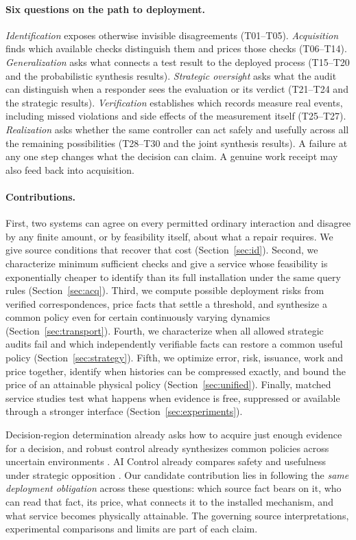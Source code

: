 \paragraph{Six questions on the path to deployment.}
\emph{Identification} exposes otherwise invisible disagreements (T01--T05). \emph{Acquisition} finds which available checks distinguish them and prices those checks (T06--T14). \emph{Generalization} asks what connects a test result to the deployed process (T15--T20 and the probabilistic synthesis results). \emph{Strategic oversight} asks what the audit can distinguish when a responder sees the evaluation or its verdict (T21--T24 and the strategic results). \emph{Verification} establishes which records measure real events, including missed violations and side effects of the measurement itself (T25--T27). \emph{Realization} asks whether the same controller can act safely and usefully across all the remaining possibilities (T28--T30 and the joint synthesis results). A failure at any one step changes what the decision can claim. A genuine work receipt may also feed back into acquisition.

\paragraph{Contributions.}
First, two systems can agree on every permitted ordinary interaction and disagree by any finite amount, or by feasibility itself, about what a repair requires. We give source conditions that recover that cost (Section~\ref{sec:id}). Second, we characterize minimum sufficient checks and give a service whose feasibility is exponentially cheaper to identify than its full installation under the same query rules (Section~\ref{sec:acq}). Third, we compute possible deployment risks from verified correspondences, price facts that settle a threshold, and synthesize a common policy even for certain continuously varying dynamics (Section~\ref{sec:transport}). Fourth, we characterize when all allowed strategic audits fail and which independently verifiable facts can restore a common useful policy (Section~\ref{sec:strategy}). Fifth, we optimize error, risk, issuance, work and price together, identify when histories can be compressed exactly, and bound the price of an attainable physical policy (Section~\ref{sec:unified}). Finally, matched service studies test what happens when evidence is free, suppressed or available through a stronger interface (Section~\ref{sec:experiments}).

Decision-region determination already asks how to acquire just enough evidence for a decision, and robust control already synthesizes common policies across uncertain environments \citep{javdani,bovy}. AI Control already compares safety and usefulness under strategic opposition \citep{control,games}. Our candidate contribution lies in following the \emph{same deployment obligation} across these questions: which source fact bears on it, who can read that fact, its price, what connects it to the installed mechanism, and what service becomes physically attainable. The governing source interpretations, experimental comparisons and limits are part of each claim.

